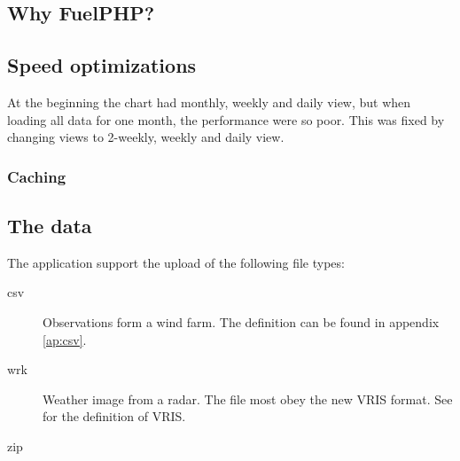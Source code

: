 \subsection{Why FuelPHP?}

\subsection{Speed optimizations}
At the beginning the chart had monthly, weekly and daily view, but when loading all data for one month, the performance were so poor. This was fixed by changing views to 2-weekly, weekly and daily view.
\subsubsection{Caching}

\subsection{The data}
The application support the upload of the following file types:
\begin{description}
\item[csv] Observations form a wind farm. The definition can be found in appendix \ref{ap:csv}.
\item[wrk] Weather image from a radar. The file most obey the new VRIS format. See \cite{VRIS} for the definition of VRIS.
\item[zip] 
\end{description}
